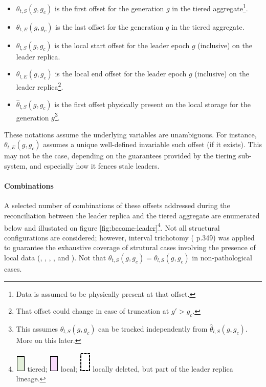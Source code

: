 \documentclass{article}
\newcommand*\circled[1]{\tikz[baseline=(char.base)]{
		\node[shape=circle,draw,inner sep=1pt] (char) {#1};}}
\begin{document}
\begin{itemize}
	\item $\theta_{t,S}(g, g_c)$ is the first offset for the generation $g$ in the tiered aggregate\footnote{Data is assumed to be physically present at that offset.}.
	\item $\theta_{t,E}(g, g_c)$ is the last offset for the generation $g$ in the tiered aggregate.
	\item $\theta_{l,S}(g, g_c)$ is the local start offset for the leader epoch $g$ (inclusive) on the leader replica.
	\item $\theta_{l,E}(g, g_c)$ is the local end offset for the leader epoch $g$ (inclusive) on the leader replica\footnote{That offset could change in case of truncation at $g' > g_c$.}.
	\item $\hat{\theta}_{l,S}(g, g_c)$ is the first offset physically present on the local storage for the generation $g$\footnote{This assumes $\theta_{l,S}(g, g_c)$ can be tracked independently from $\hat{\theta}_{l,S}(g, g_c)$. More on this later.}.
\end{itemize} 

These notations assume the underlying variables are unambiguous. For instance, $\theta_{t,E}(g, g_c)$ assumes a unique well-defined invariable such offset (if it exists). This may not be the case, depending on the guarantees provided by the tiering sub-system, and especially how it fences stale leaders.

\paragraph{Combinations}
A selected number of combinations of these offsets addressed during the reconciliation between the leader replica and the tiered aggregate are enumerated below and illustated on figure \ref{fig:become-leader}\footnote{\includegraphics[scale=0.3]{tiered.png} tiered; \includegraphics[scale=0.3]{local.png} local; \includegraphics[scale=0.3]{deleted.png} locally deleted, but part of the leader replica lineage.}. Not all structural configurations are considered; however, interval trichotomy (\cite{CLR} p.349) was applied to guarantee the exhaustive coverage of strutural cases involving the presence of local data (\circled{B}, \circled{C}, \circled{D}, \circled{E}, \circled{F} and \circled{G}). Not that $\theta_{t,S}(g, g_c) = \theta_{l,S}(g, g_c)$ in non-pathological cases.
\end{document}
